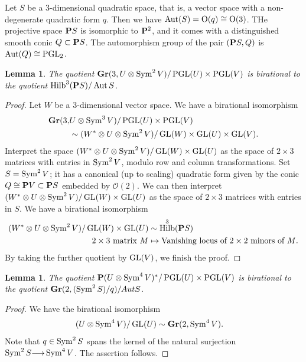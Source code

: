 \documentclass[11pt,reqno]{amsart}
\theoremstyle{plain}
\newtheorem{lemma}[theorem]{Lemma}
\theoremstyle{definition}
\theoremstyle{remark}
\numberwithin{equation}{section}
\DeclareMathOperator{\Hilb}{Hilb}
\renewcommand{\to}{{\longrightarrow}}
\numberwithin{equation}{section}
\renewcommand{\O}{\mathcal O}
\begin{document}
Let $S$ be a 3-dimensional quadratic space, that is, a vector space with a non-degenerate quadratic form $q$.
Then we have $\Aut(S) =  \operatorname{O}(q) \cong \operatorname{O(3)}$.
THe projective space $\P S$ is isomorphic to $\P^2$, and it comes with a distinguished smooth conic $Q \subset \P S$.
The automorphism group of the pair $(\P S, Q)$ is $\Aut(Q) \cong \PGL_2$.
\begin{lemma}\label{lem:quotgrass}
  The quotient $\Gr(3, U \otimes \Sym^2V) / \PGL(U) \times \PGL(V)$ is birational to the quotient $\Hilb^3(\P S) / \Aut S$.
\end{lemma}
\begin{proof}
  Let $W$ be a 3-dimensional vector space.
  We have a birational isomorphism
  \begin{align*}
    \Gr(3, &U \otimes \Sym^3 V) / \PGL(U) \times \PGL(V)\\
           &\sim (W^* \otimes U \otimes \Sym^2 V) / \GL(W) \times \GL(U) \times \GL(V).
  \end{align*}
  Interpret the space $(W^* \otimes U \otimes \Sym^2 V) / \GL(W) \times \GL(U)$ as the space of $2 \times 3$ matrices with entries in $\Sym^2 V$, modulo row and column transformations.
  Set $S = \Sym^2 V$; it has a canonical (up to scaling) quadratic form given by the conic $Q \cong \P V\subset \P S$ embedded by $\O(2)$.
  We can then interpret $(W^* \otimes U \otimes \Sym^2 V) / \GL(W) \times \GL(U)$ as the space of $2 \times 3$ matrices with entries in $S$.
  We have a birational isomorphism
  \begin{align*}
    (W^* \otimes U \otimes \Sym^2 V) / \GL(W) \times \GL(U) &\sim \Hilb^3(\P S) \\
    \text{$2 \times 3$ matrix $M$} &\mapsto \text{Vanishing locus of $2\times2$ minors of $M$}.
  \end{align*}
  By taking the further quotient by $\GL(V)$, we finish the proof.  
\end{proof}

\begin{lemma}\label{lem:quotram}
  The quotient $\P(U \otimes \Sym^4 V)^* / \PGL(U) \times \PGL(V)$ is birational to the quotient $\Gr(2, (\Sym^2 S)/q) / Aut S$.
\end{lemma}
\begin{proof}
  We have the birational isomorphism
  \begin{align*}
    (U \otimes \Sym^4 V) / \GL(U) &\sim \Gr(2, \Sym^4 V).
  \end{align*}
  Note that $q \in \Sym^2S$ spans the kernel of the natural surjection $\Sym^2 S \to \Sym^4 V$.
  The assertion follows.  
\end{proof}
\end{document}

